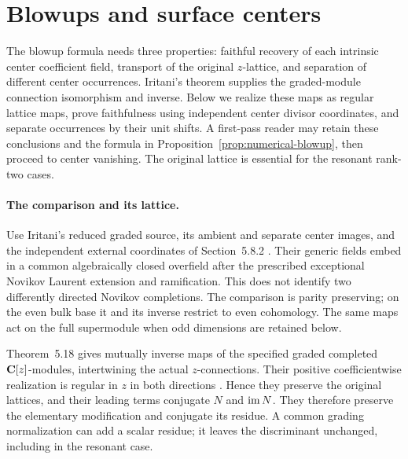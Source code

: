 \section{Blowups and surface centers}\label{sec:blowup-centers}

The blowup formula needs three properties: faithful recovery of each
intrinsic center coefficient field, transport of the original $z$-lattice,
and separation of different center occurrences. Iritani's theorem supplies
the graded-module connection isomorphism and inverse. Below we realize
these maps as regular lattice maps, prove faithfulness using independent
center divisor coordinates, and separate occurrences by their unit shifts.
A first-pass reader may retain these conclusions and the formula in
Proposition~\ref{prop:numerical-blowup}, then proceed to center vanishing.
The original lattice is essential for the resonant rank-two cases.

\paragraph{The comparison and its lattice.}
Use Iritani's reduced graded source, its ambient and separate center images,
and the independent external coordinates of Section~5.8.2
\cite[Remarks~2.3 and~5.6, Theorem~5.18]{IritaniBlowup}.
Their generic fields embed in a common algebraically closed overfield after
the prescribed exceptional Novikov Laurent extension and ramification.
This does not identify two differently directed Novikov completions.
The comparison is parity preserving; on the even bulk base it and its inverse
restrict to even cohomology. The same maps act on the full supermodule when
odd dimensions are retained below.

Theorem~5.18 gives mutually inverse maps of the specified graded completed
$\mathbf C[z]$-modules, intertwining the actual $z$-connections. Their positive
coefficientwise realization is regular in $z$ in both directions
\cite[Remark~1.5]{IritaniBlowup}. Hence they
preserve the original lattices, and their leading terms conjugate $N$ and
$\operatorname{im} N$. They therefore preserve the elementary modification and conjugate
its residue. A common grading normalization can add a scalar residue;
it leaves the discriminant unchanged, including in the resonant case.

